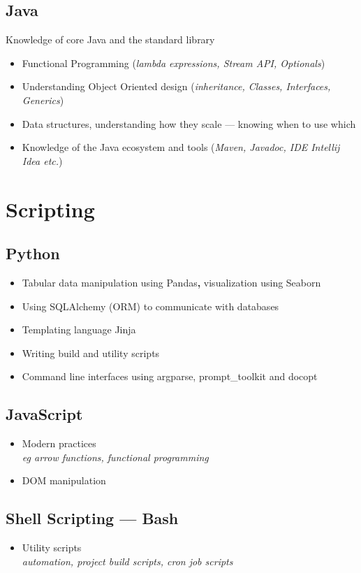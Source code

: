 \documentclass[a4paper, 13pt, draft]{article}
\newcommand{\proglang}[1]{%
    \subsection*{#1}
}
\begin{document}
\proglang{Java}

Knowledge of core Java and the standard library

\begin{itemize}
    \setlength\itemsep{0em}
\item
    Functional Programming (\textit{lambda expressions, Stream API, Optionals})
\item
Understanding Object Oriented design (\textit{inheritance, Classes, Interfaces, Generics})
\item
    Data structures, understanding how they scale --- knowing when to use which
\item
    Knowledge of the Java ecosystem and tools (\textit{Maven, Javadoc, IDE Intellij Idea etc.})
\end{itemize}

\pagebreak

\section*{\color{col1} \Large{Scripting} \color{default}}

\proglang{Python}

\begin{itemize}
    \setlength\itemsep{0em}
\item
    Tabular data manipulation using Pandas\textbf{,} visualization using
    Seaborn
\item
    Using SQLAlchemy (ORM) to communicate with databases
\item
    Templating language Jinja
\item
    Writing build and utility scripts
\item
    Command line interfaces using argparse, prompt\_toolkit and docopt \\
\end{itemize}

\begin{multicols}{2}

    \proglang{JavaScript} 

    \begin{itemize}
	\setlength\itemsep{0em}
    \item Modern practices \\ 
	\textit{eg arrow functions, functional programming}
    \item DOM manipulation 
\end{itemize}

\proglang{Shell Scripting --- Bash}

\begin{itemize}		
    \item Utility scripts \\ 
	\textit{automation, project build scripts, cron job scripts}
\end{itemize}		

\end{multicols}
\end{document}
